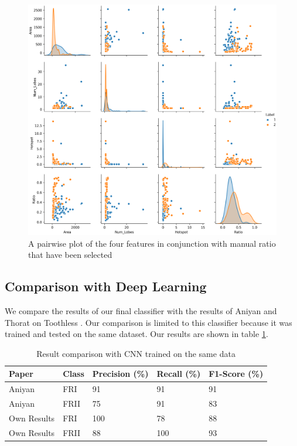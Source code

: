 \documentclass[conference]{IEEEtran}
\begin{document}
\begin{figure}
    \centering
    \includegraphics[width=\textwidth]{EPS/pairwise.eps}
    \caption{A pairwise plot of the four features in conjunction with manual ratio that have been selected}
    \label{fig:pairwise}
\end{figure}

\subsection{Comparison with Deep Learning}

We compare the results of our final classifier with the results of Aniyan and Thorat on Toothless \cite{aniyan_thorat_2017}. Our comparison is limited to this classifier because it was trained and tested on the same dataset. Our results are shown in table \ref{tab:results}.

\begin{table}[h]
  \caption{Result comparison with CNN trained on the same data}
  \label{tab:results}
  
\begin{tabular}{|l|l|l|l|l|}
\hline
Paper & Class & Precision (\%) & Recall (\%) & F1-Score (\%)  \\
 \hline
Aniyan \cite{aniyan_thorat_2017} & FRI & 91 & 91 & 91  \\
 \hline
Aniyan \cite{aniyan_thorat_2017} & FRII & 75 & 91 & 83   \\
 \hline
Own Results & FRI & 100 & 78 & 88 \\
 \hline
Own Results & FRII & 88 & 100 & 93 \\
 \hline
\end{tabular}
\end{table}
\end{document}
